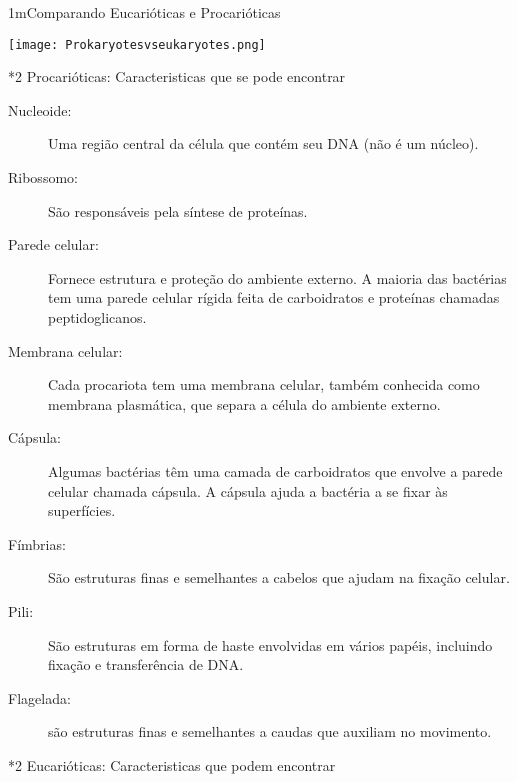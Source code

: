 \documentclass[\mainfilename]{subfiles}
\begin{document}
\begin{sectionBox}1m{Comparando Eucarióticas e Procarióticas} %
    
    \begin{center}
        \texttt{[image: Prokaryotesvseukaryotes.png]}
    \end{center}


    \begin{sectionBox}*2{
        Procarióticas: Caracteristicas que se pode encontrar
    }

        \begin{description}
            \item[Nucleoide:] Uma região central da célula que contém seu DNA (não é um núcleo).

            \item[Ribossomo:] São responsáveis pela síntese de proteínas.
            
            \item[Parede celular:] Fornece estrutura e proteção do ambiente externo. A maioria das bactérias tem uma parede celular rígida feita de carboidratos e proteínas chamadas peptidoglicanos.
            
            \item[Membrana celular:] Cada procariota tem uma membrana celular, também conhecida como membrana plasmática, que separa a célula do ambiente externo.
            
            \item[Cápsula:] Algumas bactérias têm uma camada de carboidratos que envolve a parede celular chamada cápsula. A cápsula ajuda a bactéria a se fixar às superfícies.
            
            \item[Fímbrias:] São estruturas finas e semelhantes a cabelos que ajudam na fixação celular.
            
            \item[Pili:] São estruturas em forma de haste envolvidas em vários papéis, incluindo fixação e transferência de DNA.
            
            \item[Flagelada:] são estruturas finas e semelhantes a caudas que auxiliam no movimento.
        \end{description}

    \end{sectionBox}
    \begin{sectionBox}*2{
        Eucarióticas: Caracteristicas que podem encontrar
    }
            

\end{sectionBox}
\end{sectionBox}
\end{document}

